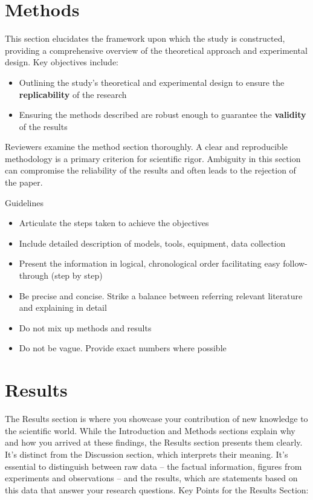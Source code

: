 \documentclass[
    twocolumn,
    fontsize = 10pt,
    parskip = half+,
    headings = small,
    headwidth = text,
    footwidth = text,
]{scrartcl}
\begin{document}
\section{Methods}
This section elucidates the framework upon which the study is constructed, providing a comprehensive overview of the theoretical approach and experimental design.
Key objectives include:
\begin{itemize}
    \item Outlining the study's theoretical and experimental design to ensure the \textbf{replicability} of the research
    \item Ensuring the methods described are robust enough to guarantee the \textbf{validity} of the results
\end{itemize}

Reviewers examine the method section thoroughly.
A clear and reproducible methodology is a primary criterion for scientific rigor.
Ambiguity in this section can compromise the reliability of the results and often leads to the rejection of the paper.

Guidelines
\begin{itemize}
    \item Articulate the steps taken to achieve the objectives
    \item Include detailed description of models, tools, equipment, data collection
    \item Present the information in logical, chronological order facilitating easy follow-through (step by step)
    \item Be precise and concise.
    Strike a balance between referring relevant literature and explaining in detail
    \item Do not mix up methods and results
    \item Do not be vague.
    Provide exact numbers where possible
\end{itemize}

\section{Results}
The Results section is where you showcase your contribution of new knowledge to the scientific world.
While the Introduction and Methods sections explain why and how you arrived at these findings, the Results section presents them clearly.
It's distinct from the Discussion section, which interprets their meaning.
It's essential to distinguish between raw data – the factual information, figures from experiments and observations – and the results, which are statements based on this data that answer your research questions.
Key Points for the Results Section:
\end{document}
